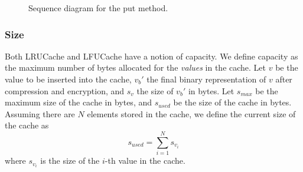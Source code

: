 \documentclass[11pt, journal]{IEEEtran}
\begin{document}
\begin{figure}
    \label{fig:put_sequence_diagram}
    \caption{Sequence diagram for the put method.}
\end{figure}

\subsubsection{Size}
Both LRUCache and LFUCache have a notion of capacity. We define capacity
as the maximum number of bytes allocated for the \textit{values} in the cache.
Let $v$ be the value to be inserted into the cache, $v_b'$
the final binary representation of $v$ after compression and encryption,
and $s_v$ the size of $v_b'$ in bytes.
Let $s_{max}$ be the maximum size
of the cache in bytes, and $s_{used}$ be the size of the cache in bytes. Assuming
there are $N$ elements stored in the cache, we define the current size of the cache
as $$ s_{used} = \sum_{i=1}^{N} s_{v_i}$$
where $s_{v_i}$ is the size of the $i$-th value in the cache.
\end{document}
